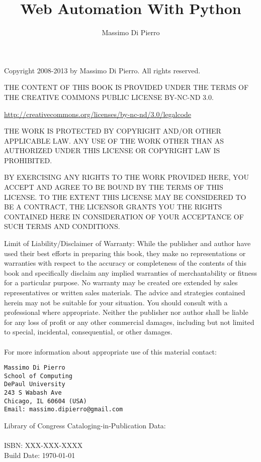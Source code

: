 \documentclass[justified,sixbynine]{tufte-book}
\title{\LARGE Web Automation With Python}
\author{Massimo Di Pierro}
\theoremstyle{plain}%
\theoremstyle{definition}
\theoremstyle{remark}
\begin{document}
\frontmatter

\maketitle

\thispagestyle{empty}
\setlength{\parindent}{0pt}
\setlength{\parskip}{2mm}
{\footnotesize
\vskip 1in
Copyright 2008-2013 by Massimo Di Pierro. All rights reserved.
\vskip 1cm

THE CONTENT OF THIS BOOK IS PROVIDED UNDER THE TERMS OF THE CREATIVE COMMONS PUBLIC LICENSE BY-NC-ND 3.0.

\url{http://creativecommons.org/licenses/by-nc-nd/3.0/legalcode}

THE WORK IS PROTECTED BY COPYRIGHT AND/OR OTHER APPLICABLE LAW. ANY USE OF THE WORK OTHER THAN AS AUTHORIZED UNDER THIS LICENSE OR COPYRIGHT LAW IS PROHIBITED.

BY EXERCISING ANY RIGHTS TO THE WORK PROVIDED HERE, YOU ACCEPT AND AGREE TO BE BOUND BY THE TERMS OF THIS LICENSE. TO THE EXTENT THIS LICENSE MAY BE CONSIDERED TO BE A CONTRACT, THE LICENSOR GRANTS YOU THE RIGHTS CONTAINED HERE IN CONSIDERATION OF YOUR ACCEPTANCE OF SUCH TERMS AND CONDITIONS.

Limit of Liability/Disclaimer of Warranty: While the publisher and
author have used their best efforts in preparing this book, they
make no representations or warranties with respect to the accuracy
or completeness of the contents of this book and specifically
disclaim any implied warranties of merchantability or fitness for a
particular purpose.  No warranty may be created ore extended by
sales representatives or written sales materials.
The advice and strategies contained herein may not be
suitable for your situation. You should consult with a professional
where appropriate.  Neither the publisher nor author shall be liable
for any loss of profit or any other commercial damages, including
but not limited to special, incidental, consequential, or other damages. \\ \\

For more information about appropriate use of this material contact:

\begin{verbatim}
Massimo Di Pierro
School of Computing
DePaul University
243 S Wabash Ave
Chicago, IL 60604 (USA)
Email: massimo.dipierro@gmail.com
\end{verbatim}

Library of Congress Cataloging-in-Publication Data: \\ \\
ISBN: XXX-XXX-XXXX \\
Build Date: \today
}
\end{document}
